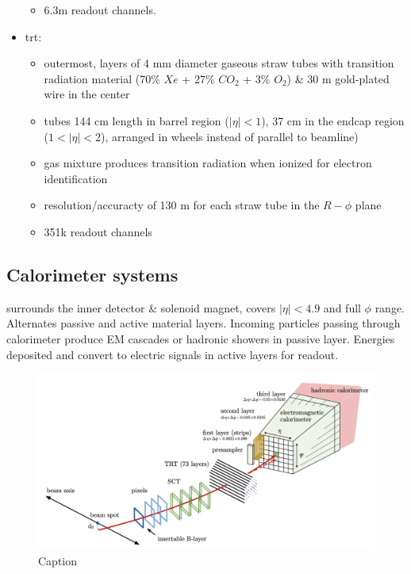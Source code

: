 \documentclass[../thesis.tex]{subfiles}
\begin{document}
\begin{itemize}
\begin{itemize}
\item 6.3m readout channels.
\end{itemize}
\item trt:
\begin{itemize}
\item outermost, layers of 4 mm diameter gaseous straw tubes with transition radiation material (70\% $Xe$ + 27\% $CO_2$ + 3\% $O_2$) \& 30 \textmu m gold-plated wire in the center
\item tubes 144 cm length in barrel region ($|\eta|<1$), 37 cm in the endcap region ($1<|\eta|<2$), arranged in wheels instead of parallel to beamline)
\item gas mixture produces transition radiation when ionized for electron identification
\item resolution/accuracty of 130 \textmu m for each straw tube in the $R-\phi$ plane
\item 351k readout channels
\end{itemize}
\end{itemize}


\subsection{Calorimeter systems}
surrounds the inner detector \& solenoid magnet, covers $|\eta|<4.9$ and full $\phi$ range. Alternates passive and active material layers. Incoming particles passing through calorimeter produce EM cascades or hadronic showers in passive layer. Energies deposited and convert to electric signals in active layers for readout.

\begin{figure}[!htbp]
\begin{center}
\includegraphics[width=\linewidth]{fig/reco_electron.png}
\caption[Caption]{\label{fig:reco:electron}Caption \citep{reco:electron_id}}
\end{center}
\end{figure}
\end{document}
